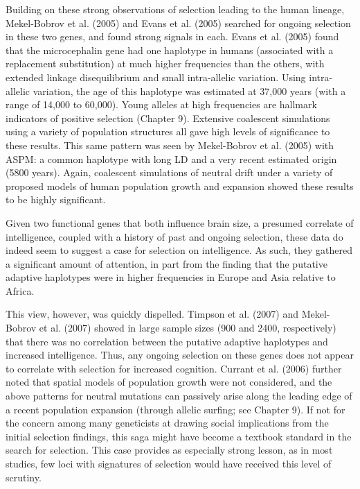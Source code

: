 \documentclass{article}
\begin{document}
Building on these strong observations of selection leading to the human lineage, Mekel-Bobrov et al. (2005) and Evans et al. (2005) searched for ongoing selection in these two genes, and found strong signals in each. Evans et al. (2005) found that the microcephalin gene had one haplotype in humans (associated with a replacement substitution) at much higher frequencies than the others, with extended linkage disequilibrium and small intra-allelic variation. Using intra-allelic variation, the age of this haplotype was estimated at 37,000 years (with a range of 14,000 to 60,000). Young alleles at high frequencies are hallmark indicators of positive selection (Chapter 9). Extensive coalescent simulations using a variety of population structures all gave high levels of significance to these results. This same pattern was seen by Mekel-Bobrov et al. (2005) with ASPM: a common haplotype with long LD and a very recent estimated origin (5800 years). Again, coalescent simulations of neutral drift under a variety of proposed models of human population growth and expansion showed these results to be highly significant.

Given two functional genes that both influence brain size, a presumed correlate of intelligence, coupled with a history of past and ongoing selection, these data do indeed seem to suggest a case for selection on intelligence. As such, they gathered a significant amount of attention, in part from the finding that the putative adaptive haplotypes were in higher frequencies in Europe and Asia relative to Africa.

This view, however, was quickly dispelled. Timpson et al. (2007) and Mekel-Bobrov et al. (2007) showed in large sample sizes (900 and 2400, respectively) that there was no correlation between the putative adaptive haplotypes and increased intelligence. Thus, any ongoing selection on these genes does not appear to correlate with selection for increased cognition. Currant et al. (2006) further noted that spatial models of population growth were not considered, and the above patterns for neutral mutations can passively arise along the leading edge of a recent population expansion (through allelic surfing; see Chapter 9). If not for the concern among many geneticists at drawing social implications from the initial selection findings, this saga might have become a textbook standard in the search for selection. This case provides as especially strong lesson, as in most studies, few loci with signatures of selection would have received this level of scrutiny.
\end{document}
